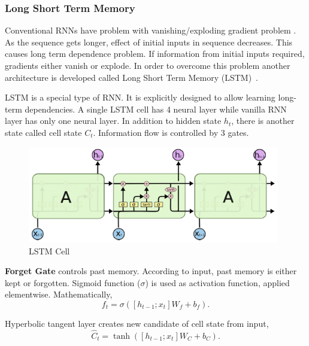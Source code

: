 \subsubsection{Long Short Term Memory}

Conventional RNNs have problem with vanishing/exploding gradient problem \cite{olah_understanding_2015}. 
As the sequence gets longer, effect of initial inputs in sequence decreases. 
This causes long term dependence problem. 
If information from initial inputs required, gradients either vanish or explode. 
In order to overcome this problem another architecture is developed called Long Short Term Memory (LSTM)~\cite{hochreiter_long_1997}. 

LSTM is a special type of RNN. 
It is explicitly designed to allow learning long-term dependencies. 
A single LSTM cell has 4 neural layer while vanilla RNN layer has only one neural layer. 
In addition to hidden state $h_t$, there is another state called cell state $C_t$. 
Information flow is controlled by 3 gates. 

\begin{figure}
	\centering
	\includegraphics[width=0.98\textwidth]{figures/ml_theory/lstm/lstm_module.png}
	\caption{LSTM Cell}
	\label{fig:lstm_cell}
\end{figure}

\textbf{Forget Gate} controls past memory. 
According to input, past memory is either kept or forgotten. 
Sigmoid function ($\sigma$) is used as activation function, applied elementwise. Mathematically, 
\begin{equation}
\label{eqn:lstm_forget}
f_t = \sigma( [h_{t-1}; x_t] W_f + b_f).
\end{equation}

Hyperbolic tangent layer creates new candidate of cell state from input, 
\begin{equation}
\label{eqn:lstm_cellstcand}
\hat{C}_t = \tanh( [h_{t-1}; x_t] W_C + b_C).
\end{equation}

